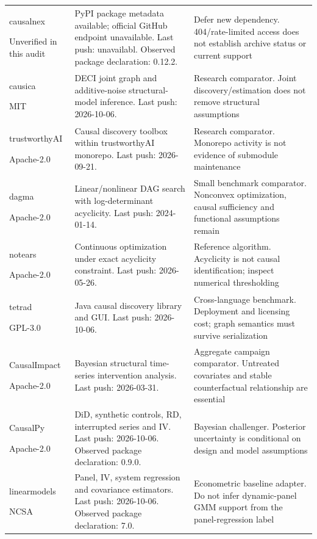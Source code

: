 \begin{longtable}{P{29mm}P{55mm}P{60mm}}
causalnex \citep{sw_causalnex}\par Unverified in this audit & PyPI package metadata available; official GitHub endpoint unavailable. Last push: unavailabl. Observed package declaration: 0.12.2. & Defer new dependency. 404/rate-limited access does not establish archive status or current support\\
causica \citep{sw_causica}\par MIT & DECI joint graph and additive-noise structural-model inference. Last push: 2026-10-06. & Research comparator. Joint discovery/estimation does not remove structural assumptions\\
trustworthyAI \citep{sw_gcastle}\par Apache-2.0 & Causal discovery toolbox within trustworthyAI monorepo. Last push: 2026-09-21. & Research comparator. Monorepo activity is not evidence of submodule maintenance\\
dagma \citep{sw_dagma}\par Apache-2.0 & Linear/nonlinear DAG search with log-determinant acyclicity. Last push: 2024-01-14. & Small benchmark comparator. Nonconvex optimization, causal sufficiency and functional assumptions remain\\
notears \citep{sw_notears}\par Apache-2.0 & Continuous optimization under exact acyclicity constraint. Last push: 2026-05-26. & Reference algorithm. Acyclicity is not causal identification; inspect numerical thresholding\\
tetrad \citep{sw_tetrad}\par GPL-3.0 & Java causal discovery library and GUI. Last push: 2026-10-06. & Cross-language benchmark. Deployment and licensing cost; graph semantics must survive serialization\\
CausalImpact \citep{sw_causalimpact}\par Apache-2.0 & Bayesian structural time-series intervention analysis. Last push: 2026-03-31. & Aggregate campaign comparator. Untreated covariates and stable counterfactual relationship are essential\\
CausalPy \citep{sw_causalpy}\par Apache-2.0 & DiD, synthetic controls, RD, interrupted series and IV. Last push: 2026-10-06. Observed package declaration: 0.9.0. & Bayesian challenger. Posterior uncertainty is conditional on design and model assumptions\\
linearmodels \citep{sw_linearmodels}\par NCSA & Panel, IV, system regression and covariance estimators. Last push: 2026-10-06. Observed package declaration: 7.0. & Econometric baseline adapter. Do not infer dynamic-panel GMM support from the panel-regression label\\

\end{longtable}
